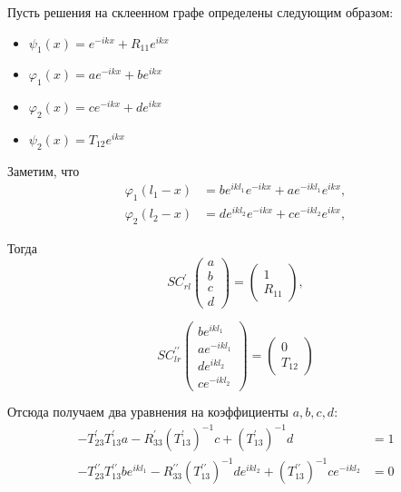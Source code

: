 \documentclass[a4 paper, 12 pt]{extarticle}
\begin{document}
   Пусть решения на склеенном графе определены следующим образом:
   \begin{itemize}
   	\item $ \psi_1\left(x\right) = e^{-ikx} + R_{11} e^{ikx} $
   	\item $ \varphi_1\left(x\right)  = a e^{-ikx} + b e^{ikx} $
   	\item $ \varphi_2\left(x\right) = c e^{-ikx} + d e^{ikx} $
   	\item $ \psi_2\left(x\right) = T_{12} e^{ikx}$
   \end{itemize}
    Заметим, что
   \[
   \begin{aligned}
   \varphi_1\left(l_1-x\right) &= b e^{ikl_1} e^{-ikx} + a e^{-ikl_1} e^{ikx}, \\
   \varphi_2\left(l_2-x\right) &= d e^{ikl_2} e^{-ikx} + c e^{-ikl_2} e^{ikx},
   \end{aligned}\]
   
   Тогда
   \begin{equation}
   \label{generalizedBoundaryCond1}
   SC_{rl}^\prime\left(
   \begin{array}{c}
   a \\
   b \\
   c \\
   d
   \end{array}\right) = \left(\begin{array}{c}
   1 \\
   R_{11}
   \end{array}\right),
   \end{equation}
   
   \begin{equation}
   \label{generalizedBoundaryCond2}
   SC_{lr}^{\prime\prime}\left(
   \begin{array}{c}
   b e^{ikl_1} \\
   a e^{-ikl_1}\\
   d e^{ikl_2}\\
   c e^{-ikl_2}
   \end{array}\right) = \left(\begin{array}{c}
   0 \\
   T_{12}
   \end{array}\right)   
   \end{equation}
   
   Отсюда получаем два уравнения на коэффициенты $a, b, c, d$:
   \[
   \begin{aligned}
   -T_{23}^\prime T_{13}^\prime a - R_{33}^\prime \left(T_{13}^\prime\right)^{-1}c + \left(T_{13}^\prime\right)^{-1}d &= 1 \\
   -T_{23}^{\prime\prime} T_{13}^{\prime\prime} b e^{ikl_1} - R_{33}^{\prime\prime} \left(T_{13}^{\prime\prime}\right)^{-1}d e^{ikl_2} + \left(T_{13}^{\prime\prime}\right)^{-1}c e^{-ikl_2} &= 0
   \end{aligned}\]
   
\end{document}

